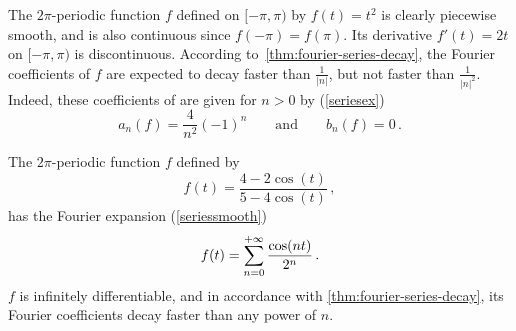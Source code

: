 \begin{example}
  The $2\pi$-periodic function $f$ defined on $[-\pi,\pi)$ by $f(t)=t^2$ is clearly
  piecewise smooth, and is also continuous since $f(-\pi)=f(\pi)$. Its derivative
  $f'(t)=2t$ on $[-\pi,\pi)$ is discontinuous. According
  to~\cref{thm:fourier-series-decay}, the Fourier coefficients of $f$ are expected to
  decay faster than $\frac{1}{|n|}$, but not faster than $\frac{1}{|n|^2 }$. Indeed, these
  coefficients of are given for $n>0$ by (\cf\cref{seriesex})
  \begin{equation}
    a_n(f)=\frac{4}{n^2}(-1)^n\qquad\text{and}\qquad b_n(f)=0\,.
  \end{equation}
\end{example}
\begin{example}
  The $2\pi$-periodic function $f$ defined by
  \begin{equation}
    f(t)=\frac{4-2\cos(t)}{5-4\cos(t)}\,,
  \end{equation}
  has the Fourier expansion (\cf\cref{seriessmooth})
  \begin{equation}
    f(t)=\sum_{n=0}^{+\infty}\frac{\cos(nt)}{2^n}\,.
  \end{equation}
  $f$ is infinitely differentiable, and in accordance with
  \cref{thm:fourier-series-decay}, its Fourier coefficients decay faster than any power of
  $n$.
\end{example}
